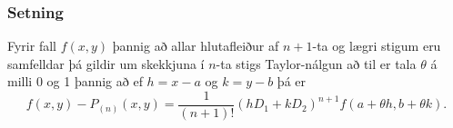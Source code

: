 \subsubsection{Setning }
 Fyrir fall $f(x,y)$ þannig að allar hlutafleiður af $n+1$-ta og lægri stigum eru samfelldar þá gildir um skekkjuna í  $n$-ta stigs Taylor-nálgun að til er tala $\theta$ á milli 0 og 1 þannig að ef $h=x-a$ og $k=y-b$ þá er 
$$f(x,y)-P_{(n)}(x,y)=\frac{1}{(n+1)!}(hD_1+kD_2)^{n+1}
f(a+\theta h, b+\theta k).$$





